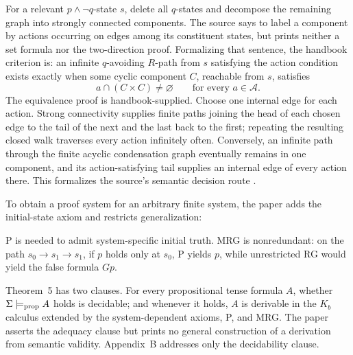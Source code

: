 For a relevant \(p\land\neg q\)-state \(s\), delete all \(q\)-states and
decompose the remaining graph into strongly connected components.  The source
says to label a component by actions occurring on edges among its constituent
states, but prints neither a set formula nor the two-direction proof.
Formalizing that sentence, the handbook criterion is: an infinite
\(q\)-avoiding \(R\)-path from \(s\) satisfying the action condition exists
exactly when some cyclic component \(C\), reachable from \(s\), satisfies
\[
 a\cap(C\times C)\ne\varnothing
 \qquad\text{for every }a\in\mathcal A.
\]
The equivalence proof is handbook-supplied.  Choose one internal edge for each
action.  Strong connectivity supplies finite paths joining the head of each
chosen edge to the tail of the next and the last back to the first; repeating
the resulting closed walk traverses every action infinitely often.  Conversely,
an infinite path through the finite acyclic condensation graph eventually
remains in one component, and its action-satisfying tail supplies an internal
edge of every action there.  This formalizes the source's semantic decision
route
\cite[p.~55]{Pnueli1977}.

To obtain a proof system for an arbitrary finite system, the paper adds the
initial-state axiom and restricts generalization:
\par\noindent
\begin{minipage}{\linewidth}
\end{minipage}
\par
P is needed to admit system-specific initial truth.  MRG is nonredundant:
on the path \(s_0\to s_1\to s_1\), if \(p\) holds only at \(s_0\), P yields
\(p\), while unrestricted RG would yield the false formula \(Gp\).

Theorem~5 has two clauses.  For every propositional tense formula \(A\), whether
\(\Sigma\models_{\rm prop}A\) holds is decidable; and whenever it holds, \(A\)
is derivable in the \(K_b\) calculus extended by the system-dependent axioms,
P, and MRG.  The paper asserts the adequacy clause but prints no general
construction of a derivation from semantic validity.  Appendix~B addresses
only the decidability clause.

